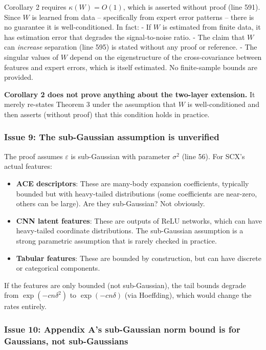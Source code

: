 \documentclass[
  12pt,
]{article}
\providecommand{\tightlist}{%
  \setlength{\itemsep}{0pt}\setlength{\parskip}{0pt}}
\begin{document}
Corollary 2 requires \(\kappa(W) = O(1)\), which is asserted without
proof (line 591). Since \(W\) is learned from data -- specifically from
expert error patterns -- there is no guarantee it is well-conditioned.
In fact: - If \(W\) is estimated from finite data, it has estimation
error that degrades the signal-to-noise ratio. - The claim that \(W\)
can \emph{increase} separation (line 595) is stated without any proof or
reference. - The singular values of \(W\) depend on the eigenstructure
of the cross-covariance between features and expert errors, which is
itself estimated. No finite-sample bounds are provided.

\textbf{Corollary 2 does not prove anything about the two-layer
extension.} It merely re-states Theorem 3 under the assumption that
\(W\) is well-conditioned and then asserts (without proof) that this
condition holds in practice.

\subsubsection{Issue 9: The sub-Gaussian assumption is
unverified}\label{issue-9-the-sub-gaussian-assumption-is-unverified}

The proof assumes \(\varepsilon\) is sub-Gaussian with parameter
\(\sigma^2\) (line 56). For SCX's actual features:

\begin{itemize}
\tightlist
\item
  \textbf{ACE descriptors}: These are many-body expansion coefficients,
  typically bounded but with heavy-tailed distributions (some
  coefficients are near-zero, others can be large). Are they
  sub-Gaussian? Not obviously.
\item
  \textbf{CNN latent features}: These are outputs of ReLU networks,
  which can have heavy-tailed coordinate distributions. The sub-Gaussian
  assumption is a strong parametric assumption that is rarely checked in
  practice.
\item
  \textbf{Tabular features}: These are bounded by construction, but can
  have discrete or categorical components.
\end{itemize}

If the features are only bounded (not sub-Gaussian), the tail bounds
degrade from \(\exp(-c n \delta^2)\) to \(\exp(-c n \delta)\) (via
Hoeffding), which would change the rates entirely.

\subsubsection{Issue 10: Appendix A's sub-Gaussian norm bound is for
Gaussians, not
sub-Gaussians}\label{issue-10-appendix-as-sub-gaussian-norm-bound-is-for-gaussians-not-sub-gaussians}
\end{document}

